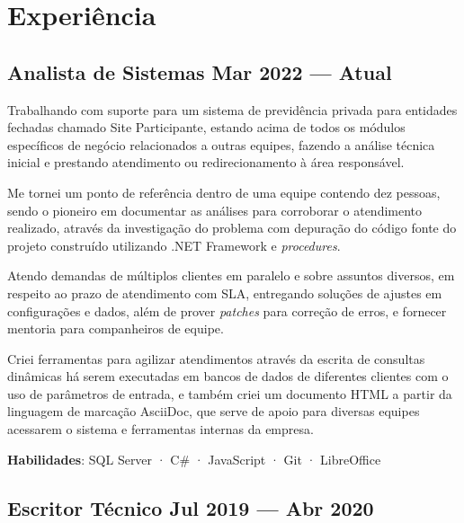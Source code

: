 \section{Experiência}

\subsection{Analista de Sistemas \hfill Mar 2022 --- Atual}

\begin{zitemize}
  \item
    Trabalhando com suporte para um sistema de previdência privada para
    entidades fechadas chamado Site Participante, estando acima de todos os
    módulos específicos de negócio relacionados a outras equipes, fazendo a
    análise técnica inicial e prestando atendimento ou redirecionamento à área
    responsável.
  \item
    Me tornei um ponto de referência dentro de uma equipe contendo dez pessoas,
    sendo o pioneiro em documentar as análises para corroborar o atendimento
    realizado, através da investigação do problema com depuração do código
    fonte do projeto construído utilizando .NET Framework e \textit{procedures}.
  \item
    Atendo demandas de múltiplos clientes em paralelo e sobre assuntos diversos,
    em respeito ao prazo de atendimento com SLA, entregando soluções de ajustes
    em configurações e dados, além de prover \textit{patches} para correção de
    erros, e fornecer mentoria para companheiros de equipe.
  \item
    Criei ferramentas para agilizar atendimentos através da escrita de
    consultas dinâmicas há serem executadas em bancos de dados de diferentes
    clientes com o uso de parâmetros de entrada, e também criei um documento
    HTML a partir da linguagem de marcação AsciiDoc, que serve de apoio para
    diversas equipes acessarem o sistema e ferramentas internas da empresa.
\end{zitemize}

\textbf{Habilidades}: SQL Server · C\# · JavaScript · Git · LibreOffice

\vspace{1em}
\subsection{Escritor Técnico \hfill Jul 2019 --- Abr 2020}

